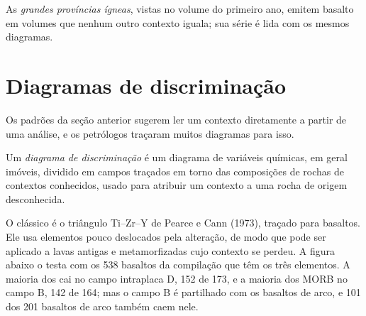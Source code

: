 As \emph{grandes províncias ígneas}, vistas no volume do primeiro ano, emitem basalto em volumes
que nenhum outro contexto iguala; sua série é lida com os mesmos diagramas.

\section{Diagramas de discriminação}\label{sec:b2:magmatic-series:discrimination}

Os padrões da seção anterior sugerem ler um contexto diretamente a partir de uma análise,
e os petrólogos traçaram muitos diagramas para isso.

\begin{definition}\label{def:b2:magmatic-series:discrimination}
Um \emph{diagrama de discriminação} é um diagrama de
variáveis químicas, em geral  imóveis, dividido em campos traçados
em torno das composições de rochas de contextos conhecidos, usado para atribuir um contexto a uma
rocha de origem desconhecida.
\end{definition}

O clássico é o triângulo Ti--Zr--Y de Pearce e Cann (1973), traçado para basaltos. Ele
usa elementos pouco deslocados pela alteração, de modo que pode ser aplicado a lavas antigas
e metamorfizadas cujo contexto se perdeu. A figura abaixo o testa com os 538 basaltos da
compilação que têm os três elementos. A maioria dos  cai no
campo intraplaca D, 152 de 173, e a maioria dos MORB no campo B, 142 de 164; mas o campo B é
partilhado com os basaltos de arco, e 101 dos 201 basaltos de arco também caem nele.

